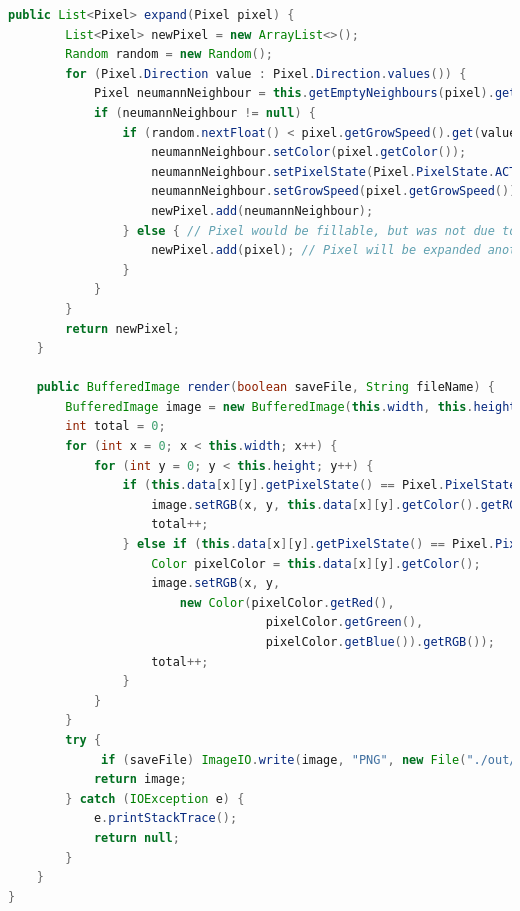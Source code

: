 \documentclass[a4paper,10pt,ngerman]{scrartcl}
\begin{document}
\begin{lstlisting}[language=Java]
    public List<Pixel> expand(Pixel pixel) {
        List<Pixel> newPixel = new ArrayList<>();
        Random random = new Random();
        for (Pixel.Direction value : Pixel.Direction.values()) {
            Pixel neumannNeighbour = this.getEmptyNeighbours(pixel).get(value);
            if (neumannNeighbour != null) {
                if (random.nextFloat() < pixel.getGrowSpeed().get(value)) {
                    neumannNeighbour.setColor(pixel.getColor());
                    neumannNeighbour.setPixelState(Pixel.PixelState.ACTIVE);
                    neumannNeighbour.setGrowSpeed(pixel.getGrowSpeed());
                    newPixel.add(neumannNeighbour);
                } else { // Pixel would be fillable, but was not due to the growSpeed
                    newPixel.add(pixel); // Pixel will be expanded another time
                }
            }
        }
        return newPixel;
    }

    public BufferedImage render(boolean saveFile, String fileName) {
        BufferedImage image = new BufferedImage(this.width, this.height, BufferedImage.TYPE_INT_RGB);
        int total = 0;
        for (int x = 0; x < this.width; x++) {
            for (int y = 0; y < this.height; y++) {
                if (this.data[x][y].getPixelState() == Pixel.PixelState.ACTIVE) {
                    image.setRGB(x, y, this.data[x][y].getColor().getRGB());
                    total++;
                } else if (this.data[x][y].getPixelState() == Pixel.PixelState.INACTIVE) {
                    Color pixelColor = this.data[x][y].getColor();
                    image.setRGB(x, y, 
                    	new Color(pixelColor.getRed(), 
                    				pixelColor.getGreen(), 
                    				pixelColor.getBlue()).getRGB());
                    total++;
                }
            }
        }
        try {
             if (saveFile) ImageIO.write(image, "PNG", new File("./out/" + fileName + ".png"));
            return image;
        } catch (IOException e) {
            e.printStackTrace();
            return null;
        }
    }
}
\end{lstlisting}
\end{document}
